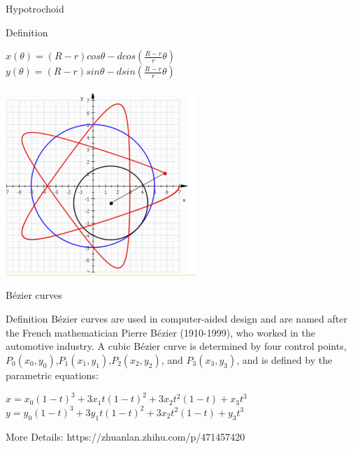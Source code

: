 \documentclass{beamer}
\begin{document}
\begin{frame}{Hypotrochoid}
    \begin{block}{Definition}
    \begin{center}
        $x(\theta)=(R-r)cos\theta-d cos(\frac{R-r}{r}\theta)$\\
        $y(\theta)=(R-r)sin\theta-d sin(\frac{R-r}{r}\theta)$\\~\\
        \includegraphics[width=0.55\linewidth]{Hypotrochoid.png}
    \end{center}
    \end{block}
\end{frame}

\begin{frame}{Bézier curves}
\begin{block}{Definition}
Bézier curves are used in computer-aided design and are named after the
French mathematician Pierre Bézier (1910-1999), who worked in the
automotive industry. A cubic Bézier curve is determined by four control
points, $P_0 (x_0,y_0)$,$P_1 (x_1,y_1)$,$P_2 (x_2,y_2)$, and $P_3 (x_3,y_3)$, and is defined by the parametric equations:
\begin{center}
    $x=x_0 (1-t)^3 + 3x_1 t(1-t)^2 + 3x_2 t^2(1-t)+ x_3 t^3$\\
    $y=y_0 (1-t)^3 + 3y_1 t(1-t)^2 + 3x_2 t^2(1-t)+ y_3 t^3$
\end{center}
\end{block}
More Details: https://zhuanlan.zhihu.com/p/471457420
\end{frame}
\end{document}
